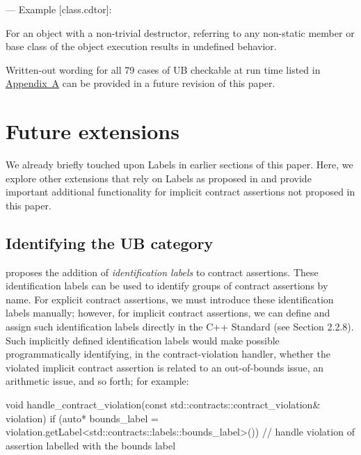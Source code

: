 --- Example [class.cdtor]:

\begin{adjustwidth}{0.5cm}{0.5cm}
For an object with a non-trivial destructor, referring to any non-static member or base class of the object  execution results in undefined behavior.
\end{adjustwidth}

Written-out wording for all 79 cases of UB checkable at run time listed in \hyperref[appendix]{Appendix~A} can be provided in a future revision of this paper.


\section{Future extensions}
\label{ext}

We already briefly touched upon Labels in earlier sections of this paper. Here, we explore other exten\-sions that rely on Labels as proposed in \cite{P3400R1} and provide important additional functionality for implicit contract assertions not proposed in this paper.

\subsection{Identifying the UB category}
\label{idlabels}

\cite{P3400R1} proposes the addition of \emph{identification labels} to contract assertions. These identification labels can be used to identify groups of contract assertions by name. For explicit contract assertions, we must introduce these identification labels manually; however, for implicit contract assertions, we can define and assign such identification labels directly in the C++ Standard (see \cite{P3400R1} Section 2.2.8). Such implicitly defined identification labels would make possible programmatically identifying, in the contract-violation handler, whether the violated implicit contract assertion  is related to an out-of-bounds issue, an arithmetic issue, and so forth; for example:

\begin{codeblock}
void handle_contract_violation(const std::contracts::contract_violation& violation)
{
  if (auto* bounds_label =
      violation.getLabel<std::contracts::labels::bounds_label>()) {
      // handle violation of assertion labelled with the bounds label
  }
}
\end{codeblock} 

